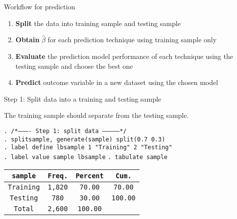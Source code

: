 \documentclass{beamer}
\newcommand{\st}[1]{\small{\texttt{#1}}}
\begin{document}
\begin{frame}{Workflow for prediction}
	\begin{enumerate}
		\item \textbf{Split} the data into {\color{red}training} sample and {\color{blue}testing} sample
		\item \textbf{Obtain} $\hat{\beta}$ for each prediction technique using {\color{red}training sample only}
		\item \textbf{Evaluate} the prediction model performance of each technique using {\color{blue}the testing sample} and choose the best one
		\item \textbf{Predict} outcome variable in a new dataset using the chosen model
	\end{enumerate}
\end{frame}

\begin{frame}{Step 1: Split data into a training and testing sample}
	\begin{tcolorbox}[title=Firewall principle, hbox,    %
		lifted shadow={1mm}{-2mm}{3mm}{0.1mm}%
		{black!50!white}]
		The training sample should separate from the testing sample.
	\end{tcolorbox}
	

\st{. /*---------- Step 1: split data --------------*/}\\
\st{. splitsample, generate(sample) split(0.7 0.3)}\\
\st{. label define lbsample 1 "Training" 2 "Testing"}\\
\st{. label value sample lbsample}
\st{. tabulate sample}
\begin{tabular}{cccc}
	\st{sample}&\st{Freq.}&\st{Percent}&\st{Cum.}\\
	\midrule
	\st{Training}&\st{1,820}&\st{70.00}&\st{70.00}\\
	\st{Testing}&\st{780}&\st{30.00}&\st{100.00}\\
	\midrule
	\st{Total}&\st{2,600}&\st{100.00}\\
\end{tabular}
\end{frame}
\end{document}
